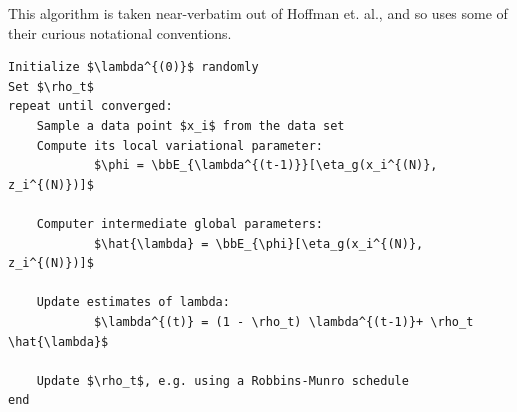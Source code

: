 \documentclass{article}
\newcommand{\bbE}{{\mathbb{E}}}
\begin{document}
This algorithm is taken near-verbatim out of Hoffman et. al., and so uses some
of their curious notational conventions.

\begin{lstlisting}[mathescape=true, keywords={}]
Initialize $\lambda^{(0)}$ randomly
Set $\rho_t$
repeat until converged:
	Sample a data point $x_i$ from the data set
	Compute its local variational parameter:
			$\phi = \bbE_{\lambda^{(t-1)}}[\eta_g(x_i^{(N)}, z_i^{(N)})]$

	Computer intermediate global parameters:
			$\hat{\lambda} = \bbE_{\phi}[\eta_g(x_i^{(N)}, z_i^{(N)})]$

	Update estimates of lambda:
			$\lambda^{(t)} = (1 - \rho_t) \lambda^{(t-1)}+ \rho_t \hat{\lambda}$

	Update $\rho_t$, e.g. using a Robbins-Munro schedule
end
\end{lstlisting}
\end{document}
